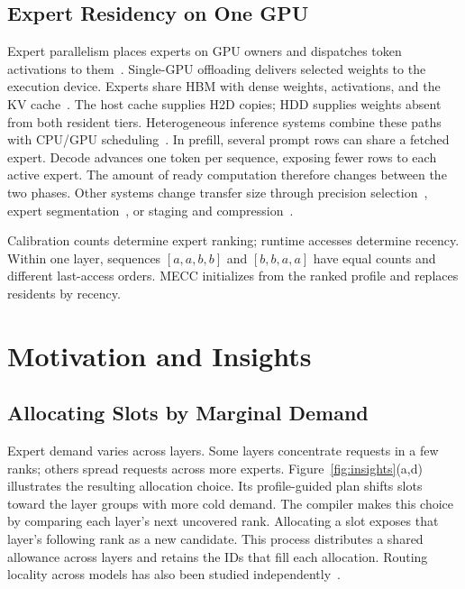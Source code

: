 \documentclass[conference,9pt,letterpaper]{IEEEtran}
\begin{document}
\subsection{Expert Residency on One GPU}
Expert parallelism places experts on GPU owners and dispatches token activations to them~\cite{deepspeedmoe,tutel,megablocks,flashmoedist,harmoeny}. Single-GPU offloading delivers selected weights to the execution device. Experts share HBM with dense weights, activations, and the KV cache~\cite{pagedattention,sglang}. The host cache supplies H2D copies; HDD supplies weights absent from both resident tiers. Heterogeneous inference systems combine these paths with CPU/GPU scheduling~\cite{flexgen,dsinference,zeroinfinity,llmflash,powerinfer,hetegen}. In prefill, several prompt rows can share a fetched expert. Decode advances one token per sequence, exposing fewer rows to each active expert. The amount of ready computation therefore changes between the two phases. Other systems change transfer size through precision selection~\cite{hobbit,specter}, expert segmentation~\cite{moepic,slicemoe}, or staging and compression~\cite{mira,zipmoe}.

Calibration counts determine expert ranking; runtime accesses determine recency. Within one layer, sequences $[a,a,b,b]$ and $[b,b,a,a]$ have equal counts and different last-access orders. MECC initializes from the ranked profile and replaces residents by recency.

\section{Motivation and Insights}
\label{sec:challenges}
\subsection{Allocating Slots by Marginal Demand}
Expert demand varies across layers. Some layers concentrate requests in a few ranks; others spread requests across more experts. Figure~\ref{fig:insights}(a,d) illustrates the resulting allocation choice. Its profile-guided plan shifts slots toward the layer groups with more cold demand. The compiler makes this choice by comparing each layer's next uncovered rank. Allocating a slot exposes that layer's following rank as a new candidate. This process distributes a shared allowance across layers and retains the IDs that fill each allocation. Routing locality across models has also been studied independently~\cite{routingconsistency}.
\end{document}
